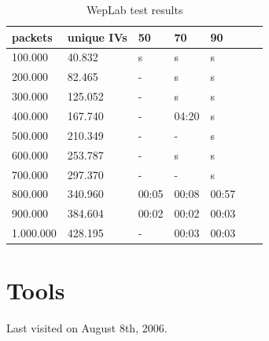 \begin{appendix}
\begin{table}[htbp]
	\begin{center}
		\begin{tabular}{|l|l|l|l|l|l|l|}
		\hline
		\bf{packets}&\bf{unique IVs} &\bf{50} &\bf{70} &\bf{90}\\
		\hline
		100.000&40.832&s&s&s\\
		\hline
		200.000&82.465&-&s&s\\
		\hline
		300.000&125.052&-&s&s\\
		\hline
		400.000&167.740&-&04:20&s\\
		\hline
		500.000&210.349&-&-&s\\
		\hline
		600.000&253.787&-&s&s\\
		\hline
		700.000&297.370&-&-&s\\
		\hline
		800.000&340.960&00:05&00:08&00:57\\
		\hline
		900.000&384.604&00:02&00:02&00:03\\
		\hline
		1.000.000&428.195&-&00:03&00:03\\
		\hline
		\end{tabular}
	\end{center}
	\vspace{-1em}
	\caption{WepLab test results}
	\label{weplab}
\end{table}

\chapter{Tools}

Last visited on August 8th, 2006.


\end{appendix}
